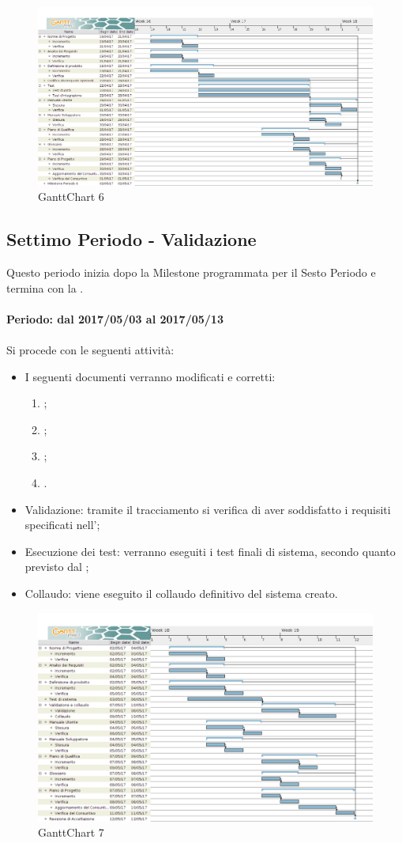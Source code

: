 \documentclass[../PianoDiProgetto_v3.0.0.tex]{subfiles}
\begin{document}
	\begin{figure}[!h]
		\centering
		\includegraphics[width=\textwidth]{Pianificazione/Immagini/GanttChart06.png}
		\caption{GanttChart 6}
	\end{figure}	
	
	\subsection{Settimo Periodo - Validazione}
	Questo periodo inizia dopo la Milestone programmata per il Sesto Periodo e termina con la \revisionediaccettazione.
	\\
	\\
	\textbf{Periodo: dal 2017/05/03 al 2017/05/13}
	\\
	\\
	Si procede con le seguenti attività:
	\begin{itemize}
		\item I seguenti documenti verranno modificati e corretti:
			\begin{enumerate}
				\item \normediprogetto;
				\item \analisideirequisiti;
				\item \pianodiqualifica;
				\item \pianodiprogetto.
			\end{enumerate}
		\item Validazione: tramite il tracciamento si verifica di aver soddisfatto i requisiti specificati nell'\analisideirequisiti;
		\item Esecuzione dei test: verranno eseguiti i test finali di sistema, secondo quanto previsto dal \pianodiqualifica;
		\item Collaudo: viene eseguito il collaudo definitivo del sistema creato.
	\end{itemize}
	
	\begin{figure}[!h]
		\centering
		\includegraphics[width=\textwidth]{Pianificazione/Immagini/GanttChart07.png}
		\caption{GanttChart 7}
	\end{figure}	
	
\end{document}
